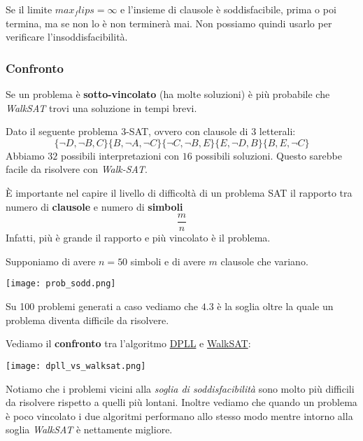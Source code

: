 Se il limite $max_flips = \infty$ e l'insieme di clausole è soddisfacibile, prima o poi termina, ma  se non lo è non terminerà mai. Non possiamo quindi usarlo per verificare l'insoddisfacibilità.

\subsubsection{Confronto}
Se un problema è \textbf{sotto-vincolato} (ha molte soluzioni) è più probabile che \textit{WalkSAT} trovi una soluzione in tempi brevi.
\begin{example}[3-SAT]
	Dato il seguente problema 3-SAT, ovvero con clausole di 3 letterali:
	\begin{equation*}
		\{\neg D, \neg B, C\} \{B, \neg A, \neg C\} \{\neg C, \neg B, E\} \{E, \neg D, B\} \{B, E, \neg C\}
	\end{equation*}
	Abbiamo $32$ possibili interpretazioni con $16$ possibili soluzioni. Questo sarebbe facile da risolvere con \textit{Walk-SAT}.
\end{example}
\noindent È importante nel capire il livello di difficoltà di un problema SAT il rapporto tra numero di \textbf{clausole} e numero di \textbf{simboli}
\begin{equation}
	\frac{m}{n}
\end{equation}
Infatti, più è grande il rapporto e più vincolato è il problema.
\begin{example}
	Supponiamo di avere $n=50$ simboli e di avere $m$ clausole che variano.
	\begin{center}
		\texttt{[image: prob\_sodd.png]}
	\end{center}
	Su 100 problemi generati a caso vediamo che $4.3$ è la soglia oltre la quale un problema diventa difficile da risolvere.
\end{example}
\noindent Vediamo il \textbf{confronto} tra l'algoritmo \hyperref[alg:dpll]{DPLL} e \hyperref[alg:walksat]{WalkSAT}:
\begin{center}
	\texttt{[image: dpll\_vs\_walksat.png]}
\end{center}
Notiamo che i problemi vicini alla \textit{soglia di soddisfacibilità} sono molto più difficili da risolvere rispetto a quelli più lontani. Inoltre vediamo che quando un problema è poco vincolato i due algoritmi performano allo stesso modo mentre intorno alla soglia \textit{WalkSAT} è nettamente migliore.